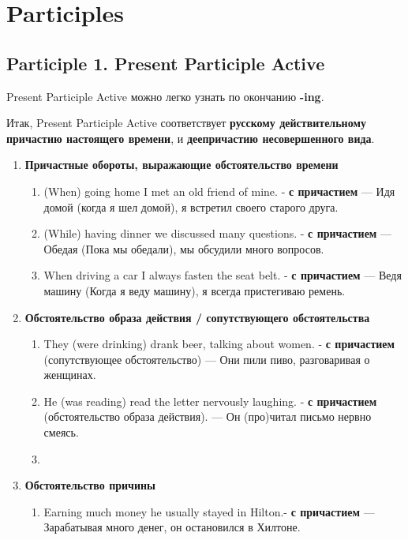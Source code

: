 \documentclass{article}
\begin{document}
\pagebreak
\section{Participles}

\subsection{Participle 1. Present Participle Active}

Present Participle Active можно легко узнать по окончанию \textbf{-ing}.

Итак, Present Participle Active соответствует \textbf{русскому действительному причастию настоящего времени}, и \textbf{деепричастию несовершенного вида}.

\begin{enumerate}
	\item \textbf{Причастные обороты, выражающие обстоятельство времени}
	\begin{enumerate}
		\item (When) going home I met an old friend of mine. - \textbf{с причастием} — Идя домой (когда я шел домой), я встретил своего старого друга.
		\item (While) having dinner we discussed many questions. - \textbf{с причастием} — Обедая (Пока мы обедали), мы обсудили много вопросов.
		\item When driving a car I always fasten the seat belt. - \textbf{с причастием} — Ведя машину (Когда я веду машину), я всегда пристегиваю ремень.
	\end{enumerate}
	\item \textbf{Обстоятельство образа действия / сопутствующего обстоятельства}
	\begin{enumerate}
		\item They (were drinking) drank beer, talking about women. - \textbf{с причастием} (сопутствующее обстоятельство) — Они пили пиво, разговаривая о женщинах.
		\item He (was reading) read the letter nervously laughing. - \textbf{с причастием} (обстоятельство образа действия). — Он (про)читал письмо нервно смеясь.
		\item 
	\end{enumerate}
	\item \textbf{Обстоятельство причины}
	\begin{enumerate}
		\item Earning much money he usually stayed in Hilton.- \textbf{с причастием} — Зарабатывая много денег, он остановился в Хилтоне.
	\end{enumerate}
\end{enumerate}
\end{document}
